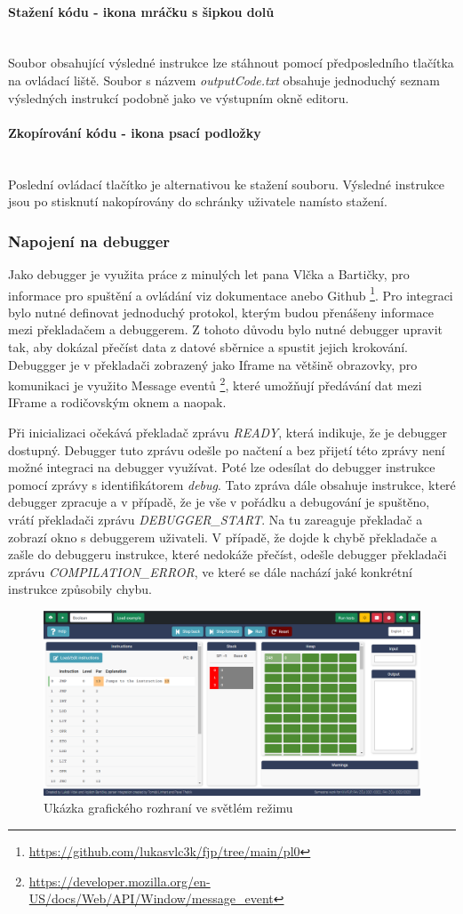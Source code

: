 \documentclass[12pt, letterpaper]{article}
\newcommand{\myparagraph}[1]{\paragraph{#1}\mbox{}\\}
\begin{document}
\myparagraph{Stažení kódu - ikona mráčku s šipkou dolů}
Soubor obsahující výsledné instrukce lze stáhnout pomocí předposledního tlačítka na ovládací liště. Soubor s názvem \textit{outputCode.txt} obsahuje jednoduchý seznam výsledných instrukcí podobně jako ve výstupním okně editoru.

\myparagraph{Zkopírování kódu - ikona psací podložky}
Poslední ovládací tlačítko je alternativou ke stažení souboru. Výsledné instrukce jsou po stisknutí nakopírovány do schránky uživatele namísto stažení.

\subsubsection{Napojení na debugger}\label{sec:debugger}
Jako debugger je využita práce z minulých let pana Vlčka a Bartičky, pro informace pro spuštění a ovládání viz dokumentace anebo Github \footnote{\url{https://github.com/lukasvlc3k/fjp/tree/main/pl0}}. Pro integraci bylo nutné definovat jednoduchý protokol, kterým budou přenášeny informace mezi překladačem a debuggerem. Z tohoto důvodu bylo nutné debugger upravit tak, aby dokázal přečíst data z datové sběrnice a spustit jejich krokování. Debuggger je v překladači zobrazený jako Iframe na většině obrazovky, pro komunikaci je využito Message eventů \footnote{\url{https://developer.mozilla.org/en-US/docs/Web/API/Window/message_event}}, které umožňují předávání dat mezi IFrame a rodičovským oknem a naopak. 

Při inicializaci očekává překladač zprávu \textit{READY}, která indikuje, že je debugger dostupný. Debugger tuto zprávu odešle po načtení a bez přijetí této zprávy není možné integraci na debugger využívat. Poté lze odesílat do debugger instrukce pomocí zprávy s identifikátorem \textit{debug}. Tato zpráva dále obsahuje instrukce, které debugger zpracuje a v případě, že je vše v pořádku a debugování je spuštěno, vrátí překladači zprávu \textit{DEBUGGER\_START}. Na tu zareaguje překladač a zobrazí okno s debuggerem uživateli. V případě, že dojde k chybě překladače a zašle do debuggeru instrukce, které nedokáže přečíst, odešle debugger překladači zprávu \textit{COMPILATION\_ERROR}, ve které se dále nachází jaké konkrétní instrukce způsobily chybu.

\begin{figure}[H]
	\centering
	\includegraphics[width=\linewidth]{img/debugger_integration.png}
	\caption{Ukázka grafického rozhraní ve světlém režimu}
	\label{fig:GUILight}
\end{figure}
%
\end{document}
